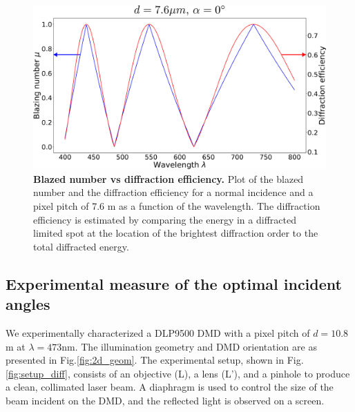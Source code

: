 \documentclass[12pt]{iopart}
\begin{document}
\begin{figure}
  \centering
  \includegraphics[width = \textwidth]{images/mu_vs_diffeff.pdf}
  \caption{
    \textbf{Blazed number vs diffraction efficiency.
    }
    Plot of the blazed number and the diffraction efficiency for a normal incidence and a pixel pitch of  7.6 \textmu m 
    as a function of the wavelength. 
    The diffraction efficiency is estimated by comparing the energy in a diffracted limited spot at the 
    location of the brightest diffraction order to the total diffracted energy.
  }
  \label{fig:mu_vs_diff}
\end{figure}

\subsection{Experimental measure of the optimal incident angles}

We experimentally characterized a DLP9500 DMD with a pixel pitch of $d = 10.8$\textmu m at $\lambda = 473$nm. The illumination geometry and DMD orientation are as presented in Fig.\ref{fig:2d_geom}. The experimental setup, shown in Fig.\ref{fig:setup_diff}, consists of an objective (L), a lens (L'), and a pinhole to produce a clean, collimated laser beam. A diaphragm is used to control the size of the beam incident on the DMD, and the reflected light is observed on a screen.
\end{document}
